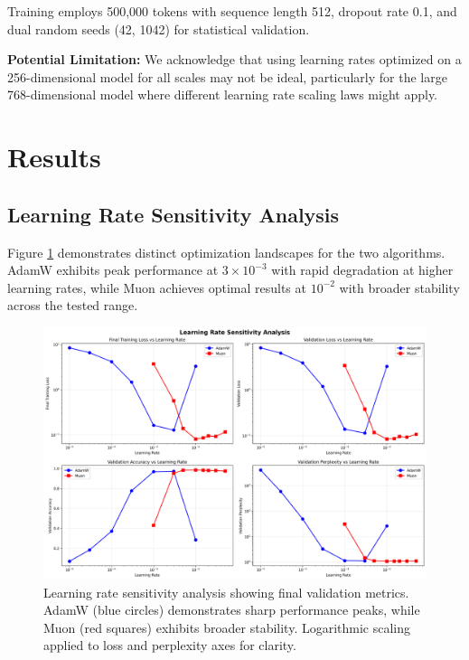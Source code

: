 \documentclass[11pt,a4paper]{article}
\begin{document}
Training employs 500,000 tokens with sequence length 512, dropout rate 0.1, and dual random seeds (42, 1042) for statistical validation.

\textbf{Potential Limitation:} We acknowledge that using learning rates optimized on a 256-dimensional model for all scales may not be ideal, particularly for the large 768-dimensional model where different learning rate scaling laws might apply.

\section{Results}

\subsection{Learning Rate Sensitivity Analysis}

Figure \ref{fig:lr_sensitivity} demonstrates distinct optimization landscapes for the two algorithms. AdamW exhibits peak performance at $3 \times 10^{-3}$ with rapid degradation at higher learning rates, while Muon achieves optimal results at $10^{-2}$ with broader stability across the tested range.

\begin{figure}[H]
    \centering
    \includegraphics[width=\textwidth]{results/experiment_1_learning_rate/lr_sensitivity_analysis.png}
    \caption{Learning rate sensitivity analysis showing final validation metrics. AdamW (blue circles) demonstrates sharp performance peaks, while Muon (red squares) exhibits broader stability. Logarithmic scaling applied to loss and perplexity axes for clarity.}
    \label{fig:lr_sensitivity}
\end{figure}
\end{document}

